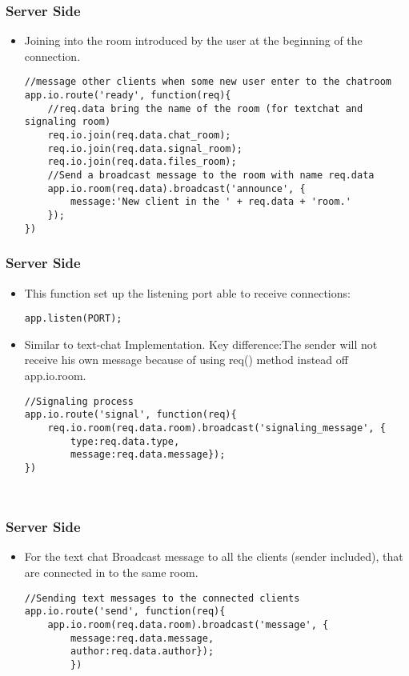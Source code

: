 \begin{frame}[fragile]\frametitle{Server Side}
\begin{itemize}

\item Joining into the room introduced by the user at the beginning of the connection.

\begin{lstlisting}[style=JavaScript]
//message other clients when some new user enter to the chatroom
app.io.route('ready', function(req){
    //req.data bring the name of the room (for textchat and signaling room)
    req.io.join(req.data.chat_room);
    req.io.join(req.data.signal_room);
    req.io.join(req.data.files_room);
    //Send a broadcast message to the room with name req.data
    app.io.room(req.data).broadcast('announce', {
        message:'New client in the ' + req.data + 'room.'
    });    
})
\end{lstlisting}
\end{itemize}
\end{frame}
\begin{frame}[fragile]\frametitle{Server Side}
\begin{itemize}
 \item This function set up the listening port able to receive connections:
\begin{lstlisting}[style=JavaScript]
app.listen(PORT);
\end{lstlisting}

\item Similar to text-chat Implementation.
Key difference:The sender will not receive his own message because of using req() method instead off app.io.room.
\begin{lstlisting}[style=JavaScript]
//Signaling process
app.io.route('signal', function(req){
    req.io.room(req.data.room).broadcast('signaling_message', {
        type:req.data.type, 
        message:req.data.message});
})
\end{lstlisting}
\begin{lstlisting}[style=JavaScript]
 
\end{lstlisting}
\end{itemize}
\end{frame}

\begin{frame}[fragile]\frametitle{Server Side}
\begin{itemize}

\item For the text chat Broadcast message to all the clients (sender included), that are connected in to the same room.
\begin{lstlisting}[style=JavaScript]
//Sending text messages to the connected clients 
app.io.route('send', function(req){
    app.io.room(req.data.room).broadcast('message', {
        message:req.data.message,
        author:req.data.author});
        })
\end{lstlisting}
\end{itemize}
\end{frame}


